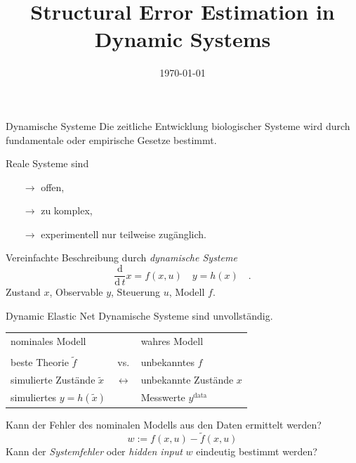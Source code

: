 



\title{Structural Error Estimation in Dynamic Systems}
\date{\today}

\maketitle

\begin{frame}{Dynamische Systeme}
	Die zeitliche Entwicklung biologischer Systeme wird durch fundamentale oder empirische Gesetze bestimmt. \\
	\pause
	
	Reale Systeme sind \pause
	\begin{itemize}
	\item[$\to$] offen, \pause
	\item[$\to$] zu komplex, \pause
	\item[$\to$] experimentell nur teilweise zugänglich. \pause
	\end{itemize}
	Vereinfachte Beschreibung durch \textit{dynamische Systeme}
	\begin{equation}
	\frac{\text{d}}{\text{d}\, t} x = f(x,u)  \quad y=h(x) \quad .
	\end{equation}
	Zustand $x$, Observable $y$, Steuerung $u$, Modell $f$.
\end{frame}

\begin{frame}{Dynamic Elastic Net}
	Dynamische Systeme sind unvollständig. \pause
	\begin{table}[h]
		\centering
		\begin{tabular}{lcl}
			nominales Modell &  & wahres Modell \\ \\
			beste Theorie $\tilde{f}$  &\textsf{vs.} & unbekanntes $f$ \\
			simulierte Zustände $\tilde{x}$ &$\longleftrightarrow$ & unbekannte Zustände $x$ \\
			simuliertes $y=h(\tilde{x})$ & & Messwerte $y^\text{data}$			
		\end{tabular}
	\end{table} \pause
	Kann der Fehler des nominalen Modells aus den Daten ermittelt werden? \pause
	\begin{equation}
	w:= f(x,u)- \tilde{f}(x,u)
	\end{equation}
	Kann der \textit{Systemfehler} oder \textit{hidden input} $w$ eindeutig bestimmt werden? 
\end{frame}


